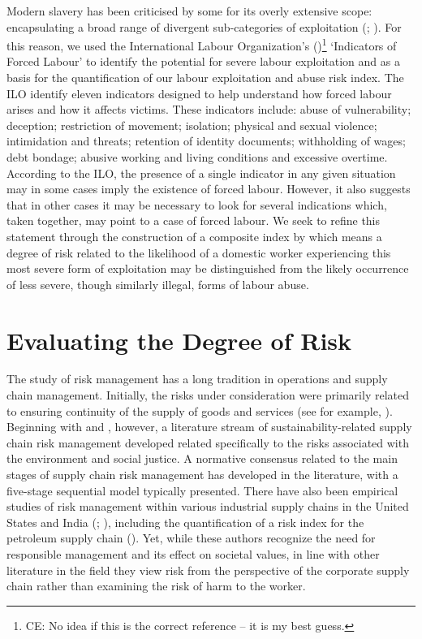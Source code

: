 \documentclass[
  12pt,
  letterpaper,
  DIV=11,
  numbers=noendperiod]{scrartcl}
\theoremstyle{plain}
\theoremstyle{definition}
\begin{document}
Modern slavery has been criticised by some for its overly extensive
scope: encapsulating a broad range of divergent sub-categories of
exploitation (\textcite{oconnell_davidson_margins_2015};
\textcite{gutierrez-huerter_o_change_2023}). For this reason, we used
the International Labour Organization's
(\textcite{ILO11-indicators})\footnote{CE: No idea if this is the
  correct reference -- it is my best guess.} `Indicators of Forced
Labour' to identify the potential for severe labour exploitation and as
a basis for the quantification of our labour exploitation and abuse risk
index. The ILO identify eleven indicators designed to help understand
how forced labour arises and how it affects victims. These indicators
include: abuse of vulnerability; deception; restriction of movement;
isolation; physical and sexual violence; intimidation and threats;
retention of identity documents; withholding of wages; debt bondage;
abusive working and living conditions and excessive overtime. According
to the ILO, the presence of a single indicator in any given situation
may in some cases imply the existence of forced labour. However, it also
suggests that in other cases it may be necessary to look for several
indications which, taken together, may point to a case of forced labour.
We seek to refine this statement through the construction of a composite
index by which means a degree of risk related to the likelihood of a
domestic worker experiencing this most severe form of exploitation may
be distinguished from the likely occurrence of less severe, though
similarly illegal, forms of labour abuse.

\section{Evaluating the Degree of
Risk}\label{evaluating-the-degree-of-risk}

The study of risk management has a long tradition in operations and
supply chain management. Initially, the risks under consideration were
primarily related to ensuring continuity of the supply of goods and
services (see for example, \textcite{juttner_supply_2003}). Beginning
with \textcite{anderson_critical_2006} and
\textcite{anderson_sustainability_2009}, however, a literature stream of
sustainability-related supply chain risk management developed related
specifically to the risks associated with the environment and social
justice. A normative consensus related to the main stages of supply
chain risk management has developed in the literature, with a five-stage
sequential model typically presented. There have also been empirical
studies of risk management within various industrial supply chains in
the United States and India (\textcite{tarei_hybrid_2018};
\textcite{dellana_scale_2021}), including the quantification of a risk
index for the petroleum supply chain (\textcite{tarei_hybrid_2018}).
Yet, while these authors recognize the need for responsible management
and its effect on societal values, in line with other literature in the
field they view risk from the perspective of the corporate supply chain
rather than examining the risk of harm to the worker.
\end{document}
